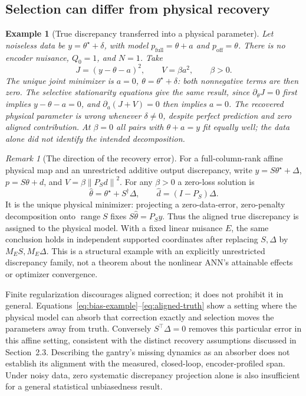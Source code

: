 \documentclass[11pt,a4paper]{article}
\newcommand{\ran}{\operatorname{range}}
\newcommand{\norm}[1]{\left\lVert#1\right\rVert}
\newcommand{\full}{\mathrm{full}}
\newcommand{\off}{\mathrm{off}}
\newtheorem{example}[proposition]{Example}
\theoremstyle{remark}
\newtheorem{remark}[proposition]{Remark}
\begin{document}
\subsection{Selection can differ from physical recovery}
\begin{example}[True discrepancy transferred into a physical parameter]\label{ex:recovery-failure}
Let noiseless data be $y=\theta^\star+\delta$, with model $p_\full=\theta+a$ and $p_\off=\theta$. There is no encoder nuisance, $Q_0=1$, and $N=1$. Take
\begin{equation}\label{eq:bias-example}
 J=(y-\theta-a)^2,\qquad V=\beta a^2,\qquad\beta>0.
\end{equation}
The unique joint minimizer is $a=0$, $\theta=\theta^\star+\delta$: both nonnegative terms are then zero. The selective stationarity equations give the same result, since $\partial_\theta J=0$ first implies $y-\theta-a=0$, and $\partial_a(J+V)=0$ then implies $a=0$. The recovered physical parameter is wrong whenever $\delta\ne0$, despite perfect prediction and zero aligned contribution. At $\beta=0$ all pairs with $\theta+a=y$ fit equally well; the data alone did not identify the intended decomposition.
\end{example}

\begin{remark}[The direction of the recovery error]\label{rem:recovery-target}
For a full-column-rank affine physical map and an unrestricted additive output discrepancy, write $y=S\theta^\star+\Delta$, $p=S\theta+d$, and $V=\beta\norm{P_Sd}^2$. For any $\beta>0$ a zero-loss solution is
\begin{equation}\label{eq:aligned-truth}
 \hat\theta=\theta^\star+S^\dagger\Delta,\qquad
 \hat d=(I-P_S)\Delta.
\end{equation}
It is the unique physical minimizer: projecting a zero-data-error, zero-penalty decomposition onto $\ran S$ fixes $S\hat\theta=P_Sy$. Thus the aligned true discrepancy is assigned to the physical model. With a fixed linear nuisance $E$, the same conclusion holds in independent supported coordinates after replacing $S,\Delta$ by $M_ES,M_E\Delta$. This is a structural example with an explicitly unrestricted discrepancy family, not a theorem about the nonlinear ANN's attainable effects or optimizer convergence.
\end{remark}
Finite regularization discourages aligned correction; it does not prohibit it in general. Equations~\eqref{eq:bias-example}--\eqref{eq:aligned-truth} show a setting where the physical model can absorb that correction exactly and selection moves the parameters away from truth. Conversely $S^\top\Delta=0$ removes this particular error in this affine setting, consistent with the distinct recovery assumptions discussed in Section~2.3. Describing the gantry's missing dynamics as an absorber does not establish its alignment with the measured, closed-loop, encoder-profiled span. Under noisy data, zero systematic discrepancy projection alone is also insufficient for a general statistical unbiasedness result.
\end{document}

